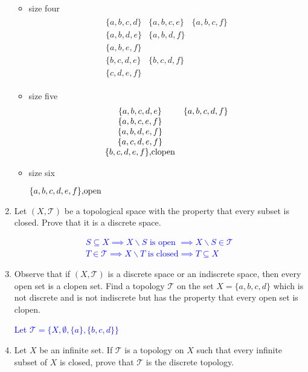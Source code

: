 \documentclass[10pt,a4paper]{report}
\newcommand{\BLUE}[1]{\textcolor{blue}{#1}}
\newcommand{\TT}{\mathcal{T}}
\begin{document}
\begin{enumerate}
\begin{itemize}
	\item size four
	\begin{align*}
		\begin{array}{ccc}
			\{a,b,c,d\} & \{a,b,c,e\} & \{a,b,c,f\}\\
			\{a,b,d,e\} & \{a,b,d,f\}\\
			\{a,b,e,f\}\\
			\{b,c,d,e\} & \{b,c,d,f\}\\
			\{c,d,e,f\}
		\end{array}
	\end{align*}
	
	\item size five
	\begin{align*}
		\begin{array}{cc}
			\{a,b,c,d,e\} & \{a,b,c,d,f\} \\
			\{a,b,c,e,f\}\\
			\{a,b,d,e,f\}\\
			\{a,c,d,e,f\}\\
			\{b,c,d,e,f\}\text{,clopen}
		\end{array}
	\end{align*}
	
	\item size six
	
		$\{a,b,c,d,e,f\}\text{,open}$
\end{itemize}

\newpage
\item Let $(X,\TT)$ be a topological space with the property that every subset is closed.  Prove that it is a discrete space.

\BLUE{\begin{align*}
	S \subseteq X \implies X\backslash S \text{ is open } \implies X\backslash S \in \TT \\
	T \in \TT \implies X\backslash T \text{ is closed} \implies T \subseteq X
\end{align*} }

\item Observe that if $(X,\TT)$ is a discrete space or an indiscrete space, then every open set is a clopen set.  Find a topology $\TT$ on the set $X=\{a,b,c,d\}$ which is not discrete and is not indiscrete but has the property that every open set is clopen.

\BLUE{Let $\TT = \{X, \emptyset, \{a\}, \{b,c,d\}\}$}

\item Let $X$ be an infinite set.  If $\TT$ is a topology on $X$ such that every infinite subset of $X$ is closed, prove that $\TT$ is the discrete topology.


\end{enumerate}
\end{document}
